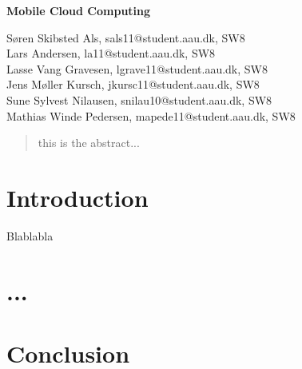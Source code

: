 \documentclass[12pt,a4paper]{article}
\begin{document}
\begin{center}
\bigskip\bigskip
{\Large\bf Mobile Cloud Computing\\}
\bigskip\bigskip


Søren Skibsted Als, sals11@student.aau.dk, SW8\\
Lars Andersen, la11@student.aau.dk, SW8\\
Lasse Vang Gravesen, lgrave11@student.aau.dk, SW8\\
Jens Møller Kursch, jkursc11@student.aau.dk, SW8\\
Sune Sylvest Nilausen, snilau10@student.aau.dk, SW8\\
Mathias Winde Pedersen, mapede11@student.aau.dk, SW8


\bigskip
\begin{abstract}
this is the abstract...
\end{abstract}

\thispagestyle{empty}
\end{center}


\titlepage

\thispagestyle{plain}


\section{Introduction}
Blablabla \citep{misc:mobilecloudcomputing}

\section{...}



\section{Conclusion}

\newpage


\label{bib:mybiblio}
\end{document}
